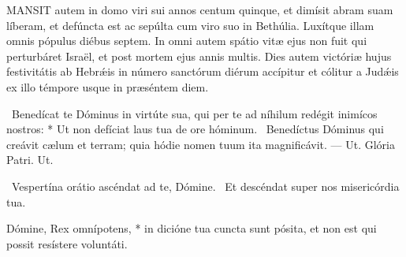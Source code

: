 

\lettrine[lines=2]{M}{ANSIT} autem in domo viri sui annos centum quinque, et dimísit abram suam líberam, et defúncta est ac sepúlta cum viro suo in Bethúlia. Luxítque illam omnis pópulus diébus septem. In omni autem spátio vitæ ejus non fuit qui perturbáret Israël, et post mortem ejus annis multis. Dies autem victóriæ hujus festivitátis ab Hebrǽis in número sanctórum diérum accípitur et cólitur a Judǽis ex illo témpore usque in præséntem diem.

\R\ Benedícat te Dóminus in virtúte sua, qui per te ad níhilum redégit inimícos nostros: * Ut non defíciat laus tua de ore hóminum. \V\ Benedíctus Dóminus qui creávit cælum et terram; quia hódie nomen tuum ita magnificávit. — Ut. Glória Patri. Ut.




\V\ Vespertína orátio ascéndat ad te, Dómine. \R\ Et descéndat super nos misericórdia tua.

 Dómine, Rex omnípotens, * in dicióne tua cuncta sunt pósita, et non est qui possit resístere voluntáti.



